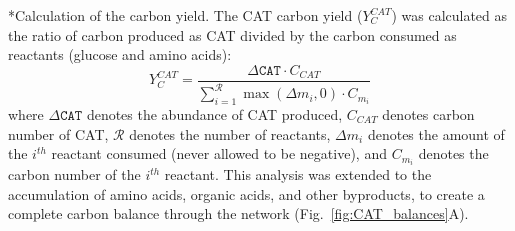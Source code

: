 \documentclass[12pt]{article}
\makeatletter
\renewcommand\subsection{\@startsection
	{subsection}{2}{0mm}
	{-0.05in}
	{-0.5\baselineskip}
	{\normalfont\normalsize\bfseries}}
\makeatother
\begin{document}
\subsection*{Calculation of the carbon yield.}
The CAT carbon yield ($Y_{C}^{CAT}$) was calculated as the ratio of carbon produced as CAT divided by the carbon consumed as reactants (glucose and amino acids):
\begin{equation}\label{eqn:yield-definition}
	Y_{C}^{CAT}=\frac{\Delta\texttt{CAT}\cdot C_{CAT}}{\displaystyle\sum_{i=1}^{\mathcal{R}}\max(\Delta m_{i},0)\cdot C_{m_i}}
\end{equation}
where $\Delta\texttt{CAT}$ denotes the abundance of CAT produced, $C_{CAT}$ denotes carbon number of CAT, $\mathcal{R}$ denotes the number of reactants,
$\Delta m_{i}$ denotes the amount of the $i^{th}$ reactant consumed (never allowed to be negative), and $C_{m_i}$ denotes the carbon number of the $i^{th}$ reactant.
This analysis was extended to the accumulation of amino acids, organic acids, and other byproducts, to create a complete carbon balance through the network (Fig.~\ref{fig:CAT_balances}A).
\end{document}
